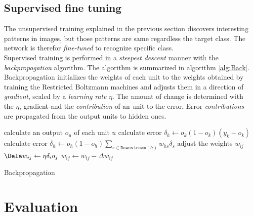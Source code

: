 
\subsection{Supervised fine tuning}

The unsupervised training explained in the previous section discovers interesting patterns in images, but those patterns are same regardless the target class. The network is therefor \textit{fine-tuned} to recognize specific class. \\

Supervised training is performed in a \textit{steepest descent} manner with the \textit{backpropagation} algorithm. The algorithm is summarized in algorithm \ref{alg:Back}. Backpropagation initializes the weights of each unit to the weights obtained by training the Restricted Boltzmann machines and adjusts them in a direction of \textit{gradient}, scaled by a \textit{learning rate} $\eta$. The amount of change is determined with the $\eta$, gradient and the \textit{contribution} of an unit to the error. Error \textit{contributions} are propagated from the output units to hidden ones. 

\begin{algorithm}
	\begin{algorithmic}[1]
					\State calculate an output  $o_u$ of each unit $u$
						\State calculate error $\delta_k \gets o_k(1-o_k)(y_k - o_k)$					
					\EndFor 
						\State calculate error $\delta_h \gets o_h(1-o_h)\sum_{s \in \mathtt{Downstream}(h)}w_{hs}\delta_s$ 					
					\EndFor
					\State adjust the weights $w_{ij}$
					\Statex \quad \quad $\Dela w_{ij} \gets \eta \delta_i o_j$ 
					\Statex \quad \quad $w_{ij} \gets w_{ij} - \Delta w_{ij}$
				\EndFor
			\EndWhile
		\EndFunction
	\end{algorithmic}
	\caption{Backpropagation}
	\label{alg:Back}
\end{algorithm} 

\section{Evaluation}


